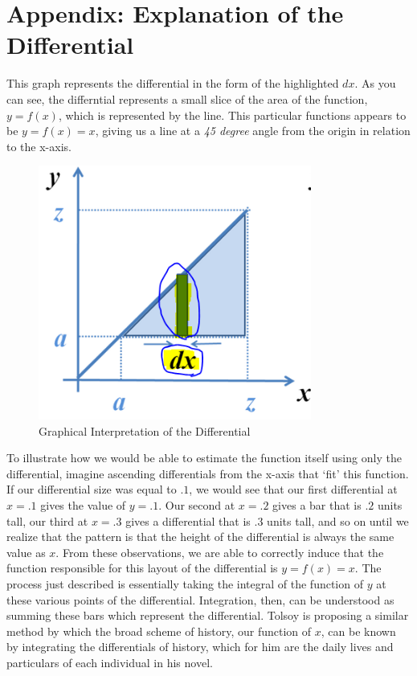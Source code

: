 \documentclass[12pt]{article}
\begin{document}
\pagebreak

\section{Appendix: Explanation of the Differential}

This graph represents the differential in the form of the highlighted $ dx $. As you can see, the differntial represents a small slice of the area of the function, $ y = f(x) $, which is represented by the line. This particular functions appears to be $ y = f(x) = x $, giving us a line at a \emph{45 degree} angle from the origin in relation to the x-axis.

\begin{figure} [!ht]
    \centering
    \includegraphics[width=0.8\textwidth]{Integration}
    \caption{Graphical Interpretation of the Differential}
    \label{figure:differential}
\end{figure}

To illustrate how we would be able to estimate the function itself using only the differential, imagine ascending differentials from the x-axis that `fit' this function. If our differential size was equal to $.1$, we would see that our first differential at $ x = .1 $ gives the value of $ y = .1 $. Our second at $ x = .2 $ gives a bar that is $.2$ units tall, our third at $ x = .3 $ gives a differential that is $.3$ units tall, and so on until we realize that the pattern is that the height of the differential is always the same value as $x$. From these observations, we are able to correctly induce that the function responsible for this layout of the differential is $ y = f(x) = x $. The process just described is essentially taking the integral of the function of $y$ at these various points of the differential. Integration, then, can be understood as summing these bars which represent the differential. Tolsoy is proposing a similar method by which the broad scheme of history, our function of $x$, can be known by integrating the differentials of history, which for him are the daily lives and particulars of each individual in his novel.
\end{document}
